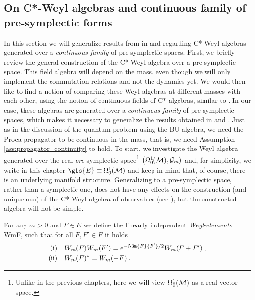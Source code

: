 \subsection{On C*-Weyl algebras and continuous family of pre-symplectic forms}\label{sec:continuous-families-of-symplectic-forms}
%
In this section we will generalize results from in \cite{rieckers_honegger_deformation} and \cite{rieckers_honegger_construction} regarding C*-Weyl algebras generated over a \emph{continuous family} of pre-symplectic spaces.
First, we briefly review the general construction of the C*-Weyl algebra over a pre-symplectic space. This field algebra will depend on the mass, even though we will only implement the commutation relations and not the dynamics yet. We would then like to find a notion of comparing these Weyl algebras at different masses with each other, using the notion of continuous fields of C*-algebras, similar to \cite{rieckers_honegger_deformation}. In our case, these algebras are generated over a \emph{continuous family} of pre-symplectic spaces, which makes it necessary to generalize the results obtained in \cite{rieckers_honegger_deformation} and \cite{rieckers_honegger_construction}. Just as in the discussion of the quantum problem using the BU-algebra, we need the Proca propagator to be continuous in the mass, that is, we need Assumption \ref{ass:propagator_continuity} to hold.
To start, we investigate the Weyl algebra generated over the real \emph{pre}-symplectic space\footnote{Unlike in the previous chapters, here we will view $\Omega^1_0(\mathcal{M})$ as a real vector space.} $\big(\Omega^1_0(\mathcal{M}),\mathcal{G}_m\big)$ and, for simplicity, we write in this chapter $\gls{E} \equiv \Omega^1_0(\M)$ and keep in mind that, of course, there is an underlying manifold structure. 
Generalizing to a pre-symplectic space, rather than a symplectic one, does not have any effects on the construction (and uniqueness) of the C*-Weyl algebra of observables (see \cite{rieckers_honegger_construction}), but the constructed algebra will not be simple.
%
%
%
\begin{definition}
\label{def:weyl_elements}
For any $m >0$ and $F \in E$ we define the linearly independent \emph{Weyl-elements} \gls{WmF}, such that for all $F,F' \in E$ it holds
\begin{align}
\textrm{(i)} \quad&W_m(F)W_m(F') = \e^{-\i \Gm{F}{F'}/2 } W_m(F + F') \formspace,\\
\textrm{(ii)} \quad&W_m(F)^* = W_m(-F) \formspace.
\end{align}
\end{definition}
